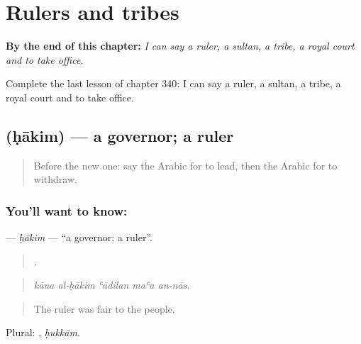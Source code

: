 
\chapter{Rulers and tribes}
\label{ch:ar-rulers-and-tribes}

\begin{chapteropening}
\textbf{By the end of this chapter:} \emph{I can say a ruler, a sultan, a tribe, a royal court and to take office.}

Complete the last lesson of chapter 340: I can say a ruler, a sultan, a tribe, a royal court and to take office.
\end{chapteropening}

\section[\texorpdfstring{\ar{حاكم} (ḥākim)}{حاكم (ḥākim)}]{ (ḥākim) — a governor; a ruler}

\label{lesson:AR-C340-hakim}



\begin{quote}
Before the new one: say the Arabic for to lead, then the Arabic for to withdraw.
\end{quote}

\subsection*{You'll want to know: }
\textbf{} — \emph{ḥākim} — \textquotedblleft{}a governor; a ruler\textquotedblright{}.

\begin{quote}
    .
\end{quote}

\begin{quote}
\emph{kāna al-ḥākim ʿādilan maʿa an-nās.}
\end{quote}

\begin{quote}
The ruler was fair to the people.
\end{quote}

Plural: , \emph{ḥukkām}.

